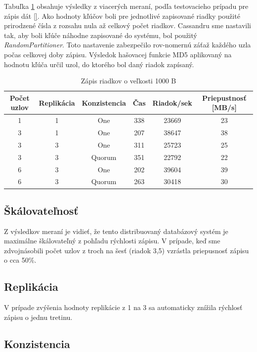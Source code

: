 \documentclass[11pt,twoside,a4paper]{book}
\begin{document}
Tabuľka \ref{tab:CPerf2} obsahuje výsledky z viacerých meraní, podľa testovacieho prípadu pre zápis dát \ref{}. Ako hodnoty kľúčov boli pre jednotlivé zapisované riadky použité prirodzené čísla z rozsahu nula až celkový počet riadkov. Cassandru sme nastavili tak, aby boli kľúče náhodne zapisované do systému, bol použitý \emph{RandomPartitioner}. Toto nastavenie zabezpečilo rov-nomernú záťaž každého uzla počas celkovej doby zápisu. Výsledok hašovacej funkcie MD5 aplikovaný na hodnotu kľúča určil uzol, do ktorého bol daný riadok zapísaný.

\begin{table}[hp]
\begin{center}
\begin{tabular}{|c|c|c|c|c|c|}
\hline Počet uzlov & Replikácia & Konzistencia & Čas & Riadok/sek & Priepustnosť [MB/s]\\ 
\hline
\hline 1 & 1 & One & 338 & 23669 & 23\\ 
\hline 3 & 1 & One & 207 & 38647 & 38\\ 
\hline 3 & 3 & One & 311 & 25723 & 25\\ 
\hline 3 & 3 & Quorum & 351 & 22792 & 22\\ 
\hline 6 & 3 & One & 202 & 39604 & 39\\ 
\hline 6 & 3 & Quorum & 263 & 30418 & 30\\ 
\hline
\end{tabular} 
\end{center}
\caption{Zápis riadkov o veľkosti 1000 B}
\label{tab:CPerf2}
\end{table}

\subsection*{Škálovateľnosť}

Z výsledkov meraní je vidieť, že tento distribuovaný databázový systém je maximálne škálovateľný z pohľadu rýchlosti zápisu. V prípade, keď sme zdvojnásobili počet uzlov z troch na šesť (riadok 3,5) vzrástla priepusnosť zápisu o cca 50\%.

\subsection*{Replikácia}

V prípade zvýšenia hodnoty replikácie z 1 na 3 sa automaticky znížila rýchlosť zápisu o jednu tretinu.

\subsection*{Konzistencia}
\end{document}
